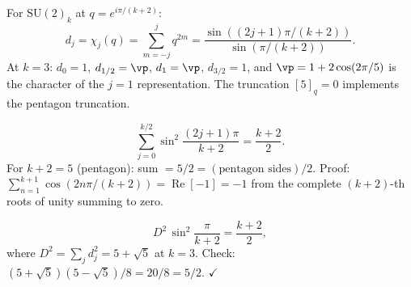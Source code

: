 \begin{lemma}[Quantum group characters at $q=e^{i\pi/(k+2)}$]
\label{P14:lem:qgroup_char}
For $\mathrm{SU}(2)_k$ at $q=e^{i\pi/(k+2)}$:
\begin{equation}
  d_j = \chi_j(q) = \sum_{m=-j}^{j}q^{2m}
  = \frac{\sin((2j+1)\pi/(k+2))}{\sin(\pi/(k+2))}.
  \label{P14:eq:qchar}
\end{equation}
At $k=3$: $d_0=1$, $d_{1/2}=\vp$, $d_1=\vp$, $d_{3/2}=1$,
and $\vp = 1+2\cos(2\pi/5)$ is the character of the $j=1$ representation.
The truncation $[5]_q=0$ implements the pentagon truncation.
\end{lemma}

\begin{lemma}
\label{P14:lem:parseval}
\begin{equation}
  \sum_{j=0}^{k/2}\sin^2\!\frac{(2j+1)\pi}{k+2} = \frac{k+2}{2}.
  \label{P14:eq:parseval_wzw}
\end{equation}
For $k+2=5$ (pentagon): sum $= 5/2 = (\text{pentagon sides})/2$.
Proof: $\sum_{n=1}^{k+1}\cos(2n\pi/(k+2)) = \operatorname{Re}[-1]=-1$
from the complete $(k+2)$-th roots of unity summing to zero.
\end{lemma}

\begin{corollary}
\label{P14:cor:D2_parseval}
\begin{equation}
  D^2\,\sin^2\!\frac{\pi}{k+2} = \frac{k+2}{2},
  \label{P14:eq:D2_sin2}
\end{equation}
where $D^2=\sum_j d_j^2 = 5+\sqrt{5}$ at $k=3$.
Check: $(5+\sqrt{5})(5-\sqrt{5})/8 = 20/8 = 5/2$. $\checkmark$
\end{corollary}

